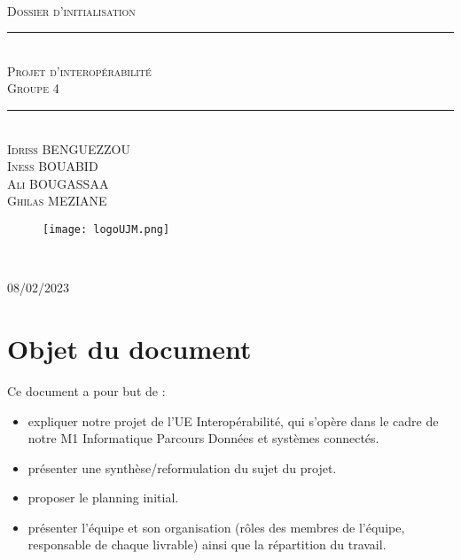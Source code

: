 \documentclass[a4paper, 12pt]{article}
\newcommand{\HRule}{\rule{\linewidth}{0.5mm}}
\begin{document}
\begin{titlepage}
  \begin{sffamily}
  \begin{center}

   
  \textsc{\LARGE }\\[2cm]

    \textsc{\Large Dossier d'initialisation}

    \HRule \\[0.4cm]
    { \huge  \textsc{Projet d'interopérabilité} \\
    \textsc{\small Groupe 4}\\ [0.4cm] }
	

    \HRule \\[2cm]
    \textsc {Idriss BENGUEZZOU\\ Iness BOUABID\\Ali BOUGASSAA\\Ghilas MEZIANE }
 \begin{figure}
     \centering
    \texttt{[image: logoUJM.png]}
     \label{fig:ujm_logo}
 \end{figure}
   
    \

    \vfill

    {\large {} 08/02/2023}

  \end{center}
  \end{sffamily}
\end{titlepage}


\newpage
\tableofcontents

\newpage
\section{Objet du document}
Ce document a pour but de :\begin{itemize}
    \item expliquer notre projet de l'UE Interopérabilité, qui s'opère dans le cadre de notre M1 Informatique Parcours Données et systèmes connectés.
    \item  présenter une synthèse/reformulation du sujet du projet.
    \item  proposer le planning initial. 
    \item présenter l'équipe et son organisation (rôles des membres de l’équipe, responsable de chaque livrable) ainsi que la répartition du travail.
\end{itemize}
\end{document}
